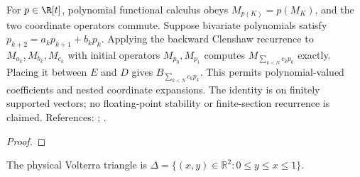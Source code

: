 \begin{theorem}
\label{thm:volterra-operator-clenshaw}
\leanok
For $p\in\R[t]$, polynomial functional calculus obeys $M_{p(K)}=p(M_K)$, and the two coordinate
operators commute. Suppose bivariate polynomials satisfy
$p_{k+2}=a_kp_{k+1}+b_kp_k$. Applying the backward Clenshaw recurrence to
$M_{a_k},M_{b_k},M_{c_k}$ with initial operators $M_{p_0},M_{p_1}$ computes
$M_{\sum_{k<N}c_kp_k}$ exactly. Placing it between $E$ and $D$ gives
$B_{\sum_{k<N}c_kp_k}$. This permits polynomial-valued coefficients and nested
coordinate expansions. The identity is on finitely supported vectors;
no floating-point stability or finite-section recurrence is claimed.
References: \cite{clenshaw}; \cite[Sections 3.1--3.2]{gutleb-olver}.
\end{theorem}
\begin{proof}
\leanok
\end{proof}


\begin{definition}
\label{def:volterra-triangle}
\leanok
The physical Volterra triangle is
$\Delta=\{(x,y)\in\mathbb R^2:0\le y\le x\le1\}$.
\end{definition}

